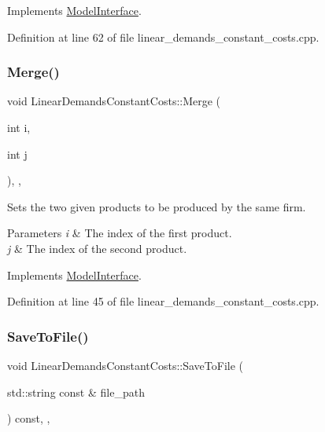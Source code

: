 Implements \hyperlink{classModelInterface_a7f408fdb15c10ce8cabf6b942bbc9c38}{Model\+Interface}.



Definition at line 62 of file linear\+\_\+demands\+\_\+constant\+\_\+costs.\+cpp.

\mbox{\label{classLinearDemandsConstantCosts_a0ee422d927b5a85f9aba8782b02f537b}} 
\subsubsection{\texorpdfstring{Merge()}{Merge()}}
{\footnotesize\ttfamily void Linear\+Demands\+Constant\+Costs\+::\+Merge (\begin{DoxyParamCaption}\item[{int}]{i,  }\item[{int}]{j }\end{DoxyParamCaption})\hspace{0.3cm}{\ttfamily [final]}, {\ttfamily [override]}, {\ttfamily [virtual]}}

Sets the two given products to be produced by the same firm.


\begin{DoxyParams}{Parameters}
{\em i} & The index of the first product. \\
\hline
{\em j} & The index of the second product. \\
\hline
\end{DoxyParams}


Implements \hyperlink{classModelInterface_a9aa52643da1fe9e74750e31a6c6ec469}{Model\+Interface}.



Definition at line 45 of file linear\+\_\+demands\+\_\+constant\+\_\+costs.\+cpp.

\mbox{\label{classLinearDemandsConstantCosts_aef2823751866a4933a8611dd4622d78b}} 
\subsubsection{\texorpdfstring{Save\+To\+File()}{SaveToFile()}}
{\footnotesize\ttfamily void Linear\+Demands\+Constant\+Costs\+::\+Save\+To\+File (\begin{DoxyParamCaption}\item[{std\+::string const \&}]{file\+\_\+path }\end{DoxyParamCaption}) const\hspace{0.3cm}{\ttfamily [final]}, {\ttfamily [override]}, {\ttfamily [virtual]}}

